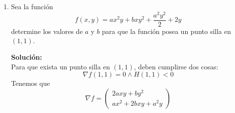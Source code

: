 \documentclass[12pt]{article}
\newenvironment{solucion}
{\begin{mdframed}[backgroundcolor=black!10]
		{\bf Solución:}\\
	}
	{
	\end{mdframed}
}
\newenvironment{preguntas}
{\begin{enumerate}\itemsep12pt
	}
	{
	\end{enumerate}
}
\newcommand{\ra}{\rightarrow}
\begin{document}
\begin{preguntas}
\begin{solucion}
Tenemos que
$$f(x,y)=x^3+3xy^2-15x-12y$$
Luego,
$$\nabla f = \begin{pmatrix} 3x^2 + 3y^2 - 15 \\ 6xy - 12 \end{pmatrix} = \vec{0}$$
Luego, tenemos que resolver
$$3x^2 + 3y^2 - 15 = 0$$
$$6xy - 12 = 0$$
Simplificando,
$$x^2 + y^2 = 5$$
$$xy = 2$$
Sumando dos veces la segunda a la primera ecuación, obtenemos
$$x^2 + 2xy + y^2 = 9$$
Luego,
$$(x+y)^2 = 9 \ra x + y = \pm3$$
Ahora, debemos ver cada uno de estos casos y despejar reemplazando en la otra ecuación.
En primer lugar, veamos el caso donde $x+y = 3$, es decir, $y = 3 - x$.\\
\\
Reemplazando,
$$x(3-x) = 2 \ra x^2-3x+2=0 \ra (x-1)(x-2) = 0$$
De aqui tenemos que $x_1 = 1\ra y_1 = 2$ y $x_2 = 2 \ra y_2 = 1$, por lo que $P_1(1,2)$ y $P_2(2,1)$.\\
\\
Veamos ahora que pasa con $x+y = -3$, es decir $y = -3-x$\\
\\
Reemplazando,
$$x(-3-x) = 2 \ra x^2+3x+2=0 \ra (x+1)(x+2) = 0$$
De aqui tenemos que $x_3 = -1 \ra y_3 = -2$ y $x_4 = -2 \ra y_4 = -1$, por lo que $P_3(-1,-2)$ y $P_4(-2,-1)$.\\
\\
Entonces, los puntos críticos son
$$P_1(1,2) \quad P_2(2,1) \quad P_3(-1,-2) \quad P_4(-2,-1)$$
Calculemos ahora el determinante del Hessiano, es decir,
$$H(x,y) = f_{xx}f_{yy} - f_{xy}^2$$
Notemos que
$$f_{xx} = 6x \quad f_{yy} = 6x \quad f_{xy} = 6y$$
Luego,
$$H(x,y) = 36(x^2-y^2)$$
Finalmente,
$$H(P_1) = H(1,2) = 36(1^2-2^2) < 0 \ra \text{Punto silla}$$
$$H(P_2) = H(2,1) = 36(2^2-1^2) > 0$$
$$f_{xx}(2,1) = 12 > 0 \ra \text{Mínimo local}$$
$$H(P_3) = H(-1,-2) = 36((-1)^2-(-2)^2) < 0 \ra \text{Punto silla}$$
$$H(P_4) = H(-2,-1) = 36((-2)^2-(-1)^2) > 0$$
$$f_{xx}(2,1) = -12 < 0 \ra \text{Máximo local}$$
\end{solucion}
\item Sea la función
	$$f(x,y)=ax^2y+bxy^2+\dfrac{a^2y^2}{2}+2y$$
	determine los valores de $a$ y $b$ para que la función posea un punto silla en $(1,1)$.
\begin{solucion}
Para que exista un punto silla en $(1,1)$, deben cumplirse dos cosas:
$$\nabla f(1,1) = 0 \wedge H(1,1) < 0$$
Tenemos que
$$\nabla f = \begin{pmatrix} 2axy + by^2 \\ ax^2 + 2bxy + a^2y\end{pmatrix}$$

\end{solucion}
\end{preguntas}
\end{document}
